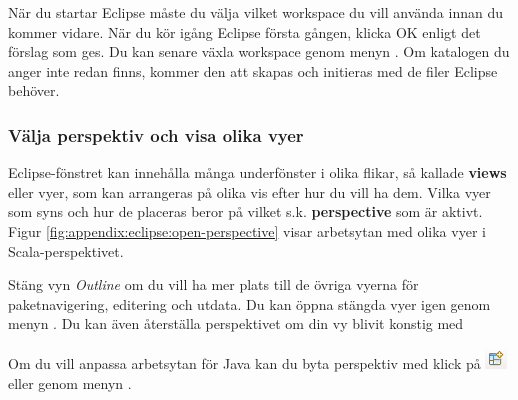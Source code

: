 När du startar Eclipse måste du välja vilket workspace du vill använda innan du kommer vidare. När du kör igång Eclipse första gången, klicka OK enligt det förslag som ges. Du kan senare växla workspace genom menyn . Om katalogen du anger inte redan finns, kommer den att skapas och initieras med de filer Eclipse behöver.

%

\subsubsection{Välja perspektiv och visa olika vyer}

Eclipse-fönstret kan innehålla många underfönster i olika flikar, så kallade \textbf{views} eller vyer, som kan arrangeras på olika vis efter hur du vill ha dem. Vilka vyer som syns och hur de placeras beror på vilket s.k. \textbf{perspective} som är aktivt.  Figur \ref{fig:appendix:eclipse:open-perspective} visar arbetsytan med olika vyer i Scala-perspektivet.

Stäng vyn \textit{Outline} om du vill ha mer plats till de övriga vyerna för paketnavigering, editering och utdata. Du kan öppna stängda vyer igen genom menyn .
Du kan även återställa perspektivet om din vy blivit konstig med 

Om du vill anpassa arbetsytan för Java kan du byta perspektiv med klick på \includegraphics[scale=0.75]{../img/eclipse/eclipse-perspective-button.png} eller genom menyn .

